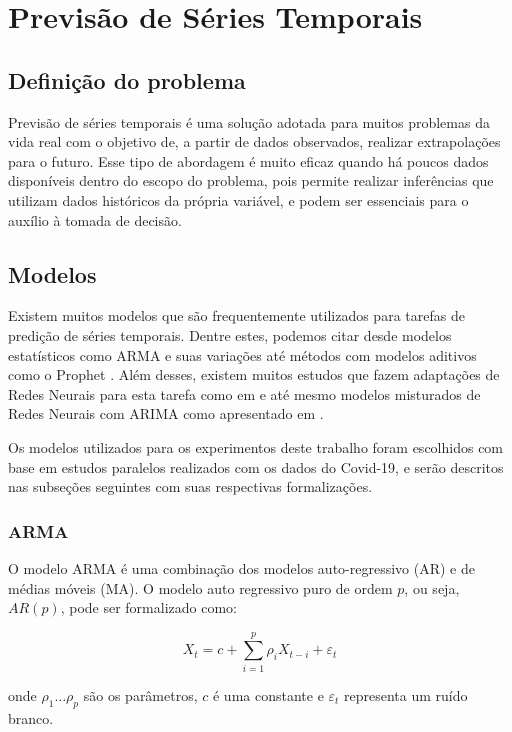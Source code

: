 \chapter{Previsão de Séries Temporais}

\section{Definição do problema}
Previsão de séries temporais é uma solução adotada para muitos problemas da vida real com o objetivo de, a partir de dados observados, realizar extrapolações para o futuro. Esse tipo de abordagem é muito eficaz quando há poucos dados disponíveis dentro do escopo do problema, pois permite realizar inferências que utilizam dados históricos da própria variável, e podem ser essenciais para o auxílio à tomada de decisão.



\section{Modelos}
Existem muitos modelos que são frequentemente utilizados para tarefas de predição de séries temporais. Dentre estes, podemos citar desde modelos estatísticos como ARMA \cite{box&jenkins} e suas variações \cite{ALZAHRANI2020914} até métodos com modelos aditivos como o Prophet \cite{fbprophet}. Além desses, existem muitos estudos que fazem adaptações de Redes Neurais para esta tarefa como em \cite{ZHANG2005501} e até mesmo modelos misturados de Redes Neurais com ARIMA como apresentado em \cite{ZHANG2003159}.

Os modelos utilizados para os experimentos deste trabalho foram escolhidos com base em estudos paralelos realizados com os dados do Covid-19, e serão descritos nas subseções seguintes com suas respectivas formalizações.
\subsection{ARMA}
O modelo ARMA é uma combinação dos modelos auto-regressivo (AR) e de médias móveis (MA). O modelo auto regressivo puro de ordem $p$, ou seja, $AR(p)$, pode ser formalizado como:

\[X_{t}=c+\sum ^{p}_{i=1}\rho _{i}X_{t-i}+\varepsilon _{t}\]

onde $\rho _{1}\ldots \rho _{p}$ são os parâmetros, $c$ é uma constante e $\varepsilon _{t}$ representa um ruído branco.

